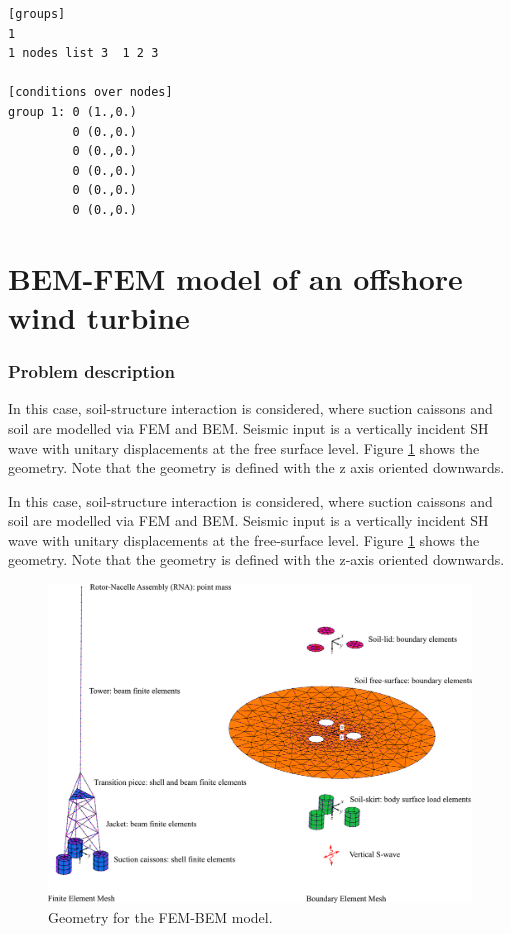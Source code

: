 \documentclass[a4]{article}
\begin{document}
\begin{Verbatim}
[groups]
1
1 nodes list 3  1 2 3 

[conditions over nodes]
group 1: 0 (1.,0.)
         0 (0.,0.)
         0 (0.,0.)
         0 (0.,0.)
         0 (0.,0.)
         0 (0.,0.)
\end{Verbatim}

\part{BEM-FEM model of an offshore wind turbine}

\section{Problem description}


In this case, soil-structure interaction is considered, where suction caissons and soil are modelled via FEM and BEM. Seismic input is a vertically incident SH wave with unitary displacements at the free surface level. Figure \ref{fig:geometry2} shows the geometry. Note that the geometry is defined with the z axis oriented downwards.

In this case, soil-structure interaction is considered, where suction caissons and soil are modelled via FEM and BEM. Seismic input is a vertically incident SH wave with unitary displacements at the free-surface level. Figure \ref{fig:geometry2} shows the geometry. Note that the geometry is defined with the z-axis oriented downwards.


\begin{figure}[tbh!]
	\centering
	\includegraphics[scale=0.35]{owt_model_flexible.pdf}
	\caption{Geometry for the FEM-BEM model.}
	\label{fig:geometry2}
\end{figure}
\end{document}
